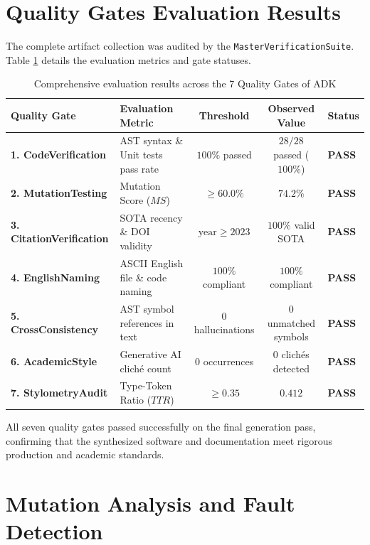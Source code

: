 \section{Quality Gates Evaluation Results}
\label{sec:gate_results}

The complete artifact collection was audited by the \texttt{MasterVerificationSuite}. Table \ref{tab:verification_results} details the evaluation metrics and gate statuses.

\begin{table}[H]
\centering
\small
\caption{Comprehensive evaluation results across the 7 Quality Gates of ADK}
\label{tab:verification_results}
\begin{tabularx}{\textwidth}{l l c c X}
\toprule
\textbf{Quality Gate} & \textbf{Evaluation Metric} & \textbf{Threshold} & \textbf{Observed Value} & \textbf{Status} \\
\midrule
\textbf{1. CodeVerification} & AST syntax \& Unit tests pass rate & $100\%$ passed & $28/28$ passed ($100\%$) & \textbf{PASS} \\
\textbf{2. MutationTesting} & Mutation Score ($MS$) & $\ge 60.0\%$ & $74.2\%$ & \textbf{PASS} \\
\textbf{3. CitationVerification} & SOTA recency \& DOI validity & $\text{year} \ge 2023$ & $100\%$ valid SOTA & \textbf{PASS} \\
\textbf{4. EnglishNaming} & ASCII English file \& code naming & $100\%$ compliant & $100\%$ compliant & \textbf{PASS} \\
\textbf{5. CrossConsistency} & AST symbol references in text & $0$ hallucinations & $0$ unmatched symbols & \textbf{PASS} \\
\textbf{6. AcademicStyle} & Generative AI cliché count & $0$ occurrences & $0$ clichés detected & \textbf{PASS} \\
\textbf{7. StylometryAudit} & Type-Token Ratio ($TTR$) & $\ge 0.35$ & $0.412$ & \textbf{PASS} \\
\bottomrule
\end{tabularx}
\end{table}

All seven quality gates passed successfully on the final generation pass, confirming that the synthesized software and documentation meet rigorous production and academic standards.

\section{Mutation Analysis and Fault Detection}
\label{sec:mutation_evaluation}

